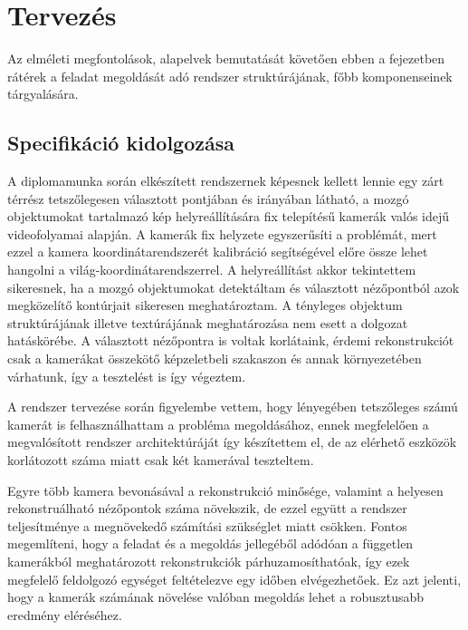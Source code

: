 \chapter{Tervezés \label{chapter3}}

Az elméleti megfontolások, alapelvek bemutatását követően ebben a fejezetben rátérek a feladat megoldását adó rendszer struktúrájának, főbb komponenseinek tárgyalására.

\section{Specifikáció kidolgozása}

A diplomamunka során elkészített rendszernek képesnek kellett lennie egy zárt térrész tetszőlegesen választott pontjában és irányában látható, a mozgó objektumokat tartalmazó kép helyreállítására fix telepítésű kamerák valós idejű videofolyamai alapján. A kamerák fix helyzete egyszerűsíti a problémát, mert ezzel a kamera koordinátarendszerét kalibráció segítségével előre össze lehet hangolni a világ-koordinátarendszerrel. A helyreállítást akkor tekintettem sikeresnek, ha a mozgó objektumokat detektáltam és választott nézőpontból azok megközelítő kontúrjait sikeresen meghatároztam. A tényleges objektum struktúrájának illetve textúrájának meghatározása nem esett a dolgozat hatáskörébe. A választott nézőpontra is voltak korlátaink, érdemi rekonstrukciót csak a kamerákat összekötő képzeletbeli szakaszon és annak környezetében várhatunk, így a tesztelést is így végeztem.

A rendszer tervezése során figyelembe vettem, hogy lényegében tetszőleges számú kamerát is felhasználhattam a probléma megoldásához, ennek megfelelően a megvalósított rendszer architektúráját így készítettem el, de az elérhető eszközök korlátozott száma miatt csak két kamerával teszteltem.

Egyre több kamera bevonásával a rekonstrukció minősége, valamint a helyesen rekonstruálható nézőpontok száma növekszik, de ezzel együtt a rendszer teljesítménye a megnövekedő számítási szükséglet miatt csökken. Fontos megemlíteni, hogy a feladat és a megoldás jellegéből adódóan a független kamerákból meghatározott rekonstrukciók párhuzamosíthatóak, így ezek megfelelő feldolgozó egységet feltételezve egy időben elvégezhetőek. Ez azt jelenti, hogy a kamerák számának növelése valóban megoldás lehet a robusztusabb eredmény eléréséhez.

